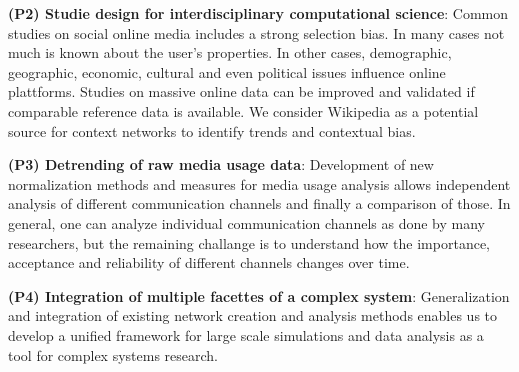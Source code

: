 \documentclass[a4paper,10pt]{scrbook}
\begin{document}
\textbf{(P2) Studie design for interdisciplinary computational science}: Common studies on social online media includes a strong selection bias. In many cases not much is known about the user's properties. In other cases, demographic, geographic, economic, cultural and even political issues influence online plattforms. Studies on massive online data can be improved and validated if comparable reference data is available. We consider Wikipedia as a potential source for context networks to identify trends and contextual bias.

\textbf{(P3) Detrending of raw media usage data}: Development of new normalization methods and measures for media usage analysis allows independent analysis of different communication channels and finally a comparison of
those. In general, one can analyze individual communication channels as done by many researchers, but the remaining challange is to understand how the importance, acceptance and reliability of different channels changes over time. 

\textbf{(P4) Integration of multiple facettes of a complex system}: Generalization and integration of existing network creation and analysis methods enables us to develop a unified framework for large scale simulations and data analysis as a tool for complex systems research.

%
%
\end{document}
